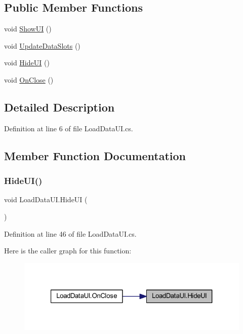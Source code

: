 \subsection*{Public Member Functions}
\begin{DoxyCompactItemize}
\item 
void \mbox{\hyperlink{class_load_data_u_i_ac0ab99a18f93b2092d30e1ecea86154d}{Show\+UI}} ()
\item 
void \mbox{\hyperlink{class_load_data_u_i_a2a36a17c6455a8ca8ee3b92dbbce0503}{Update\+Data\+Slots}} ()
\item 
void \mbox{\hyperlink{class_load_data_u_i_a7909089cf85db5310a5659a7f671b203}{Hide\+UI}} ()
\item 
void \mbox{\hyperlink{class_load_data_u_i_a5d74ebc8dc0756974c13087df72872f0}{On\+Close}} ()
\end{DoxyCompactItemize}


\subsection{Detailed Description}


Definition at line 6 of file Load\+Data\+U\+I.\+cs.



\subsection{Member Function Documentation}
\mbox{\label{class_load_data_u_i_a7909089cf85db5310a5659a7f671b203}} 
\subsubsection{\texorpdfstring{HideUI()}{HideUI()}}
{\footnotesize\ttfamily void Load\+Data\+U\+I.\+Hide\+UI (\begin{DoxyParamCaption}{ }\end{DoxyParamCaption})}



Definition at line 46 of file Load\+Data\+U\+I.\+cs.

Here is the caller graph for this function\+:
\nopagebreak
\begin{figure}[H]
\begin{center}
\leavevmode
\includegraphics[width=321pt]{class_load_data_u_i_a7909089cf85db5310a5659a7f671b203_icgraph}
\end{center}
\end{figure}
\mbox{\label{class_load_data_u_i_a5d74ebc8dc0756974c13087df72872f0}} 
